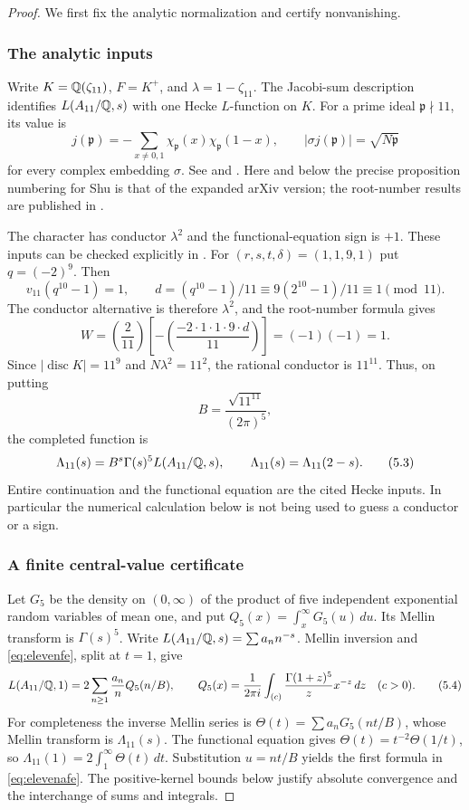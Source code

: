 \begin{proof}
We first fix the analytic normalization and certify nonvanishing.
\subsubsection{The analytic inputs}

Write $K=\mathbb Q(\zeta_{11})$, $F=K^+$, and
$\lambda=1-\zeta_{11}$. The Jacobi-sum description identifies
$L(A_{11}/\mathbb Q,s)$ with one Hecke $L$-function on $K$.
For a prime ideal $\mathfrak p\nmid11$, its value is
\[
j(\mathfrak p)=-\sum_{x\ne0,1}\chi_{\mathfrak p}(x)
                                      \chi_{\mathfrak p}(1-x),
\qquad |\sigma j(\mathfrak p)|=\sqrt{N\mathfrak p}
\]
for every complex embedding $\sigma$.
See \citet[\S1 and \S3]{GrossRohrlich1978} and
\citet[\S2.1--2.2, pp.~5--6]{ShuExpanded2021}.
Here and below the precise proposition numbering for Shu is that of
the expanded arXiv version; the root-number results are published in
\citet{Shu2021}.

The character has conductor $\lambda^2$ and the functional-equation
sign is $+1$. These inputs can be checked explicitly in
\citet[Proposition 3.12(2), p.~16; Theorem 3.13, pp.~17--18]{ShuExpanded2021}.
For $(r,s,t,\delta)=(1,1,9,1)$ put $q=(-2)^9$. Then
\[
v_{11}(q^{10}-1)=1,\qquad
 d=(q^{10}-1)/11\equiv
 9(2^{10}-1)/11\equiv1\pmod{11}.
\]
The conductor alternative is therefore $\lambda^2$, and the root-number
formula gives
\[
W=\left(\frac2{11}\right)
  \left[-\left(\frac{-2\cdot1\cdot1\cdot9\cdot d}{11}\right)\right]
  =(-1)(-1)=1.
\]
Since $|\operatorname{disc}K|=11^9$ and $N\lambda^2=11^2$, the rational
conductor is $11^{11}$. Thus, on putting
\[
B=\frac{\sqrt{11^{11}}}{(2\pi)^5},
\]
the completed function is
\[
\Lambda_{11}(s)=B^s\Gamma(s)^5L(A_{11}/\mathbb Q,s),\qquad
\Lambda_{11}(s)=\Lambda_{11}(2-s).
\tag{5.3}\label{eq:elevenfe}
\]
Entire continuation and the functional equation are the cited Hecke
inputs. In particular the numerical calculation below is not being
used to guess a conductor or a sign.

\subsubsection{A finite central-value certificate}

Let $G_5$ be the density on $(0,\infty)$ of the product of five
independent exponential random variables of mean one, and put
$Q_5(x)=\int_x^\infty G_5(u)\,du$. Its Mellin transform is
$\Gamma(s)^5$. Write $L(A_{11}/\mathbb Q,s)=\sum a_nn^{-s}$.
Mellin inversion and \eqref{eq:elevenfe}, split at $t=1$, give
\[
L(A_{11}/\mathbb Q,1)=2\sum_{n\geq1}\frac{a_n}{n}Q_5(n/B),
\qquad
Q_5(x)=\frac1{2\pi i}\int_{(c)}
             \frac{\Gamma(1+z)^5}{z}x^{-z}\,dz\quad(c>0).
\tag{5.4}\label{eq:elevenafe}
\]
For completeness the inverse Mellin series is
$\Theta(t)=\sum a_nG_5(nt/B)$, whose Mellin transform is
$\Lambda_{11}(s)$. The functional equation gives
$\Theta(t)=t^{-2}\Theta(1/t)$, so
$\Lambda_{11}(1)=2\int_1^\infty\Theta(t)\,dt$.
Substitution $u=nt/B$ yields the first formula in
\eqref{eq:elevenafe}. The positive-kernel bounds below justify absolute
convergence and the interchange of sums and integrals.


\end{proof}
